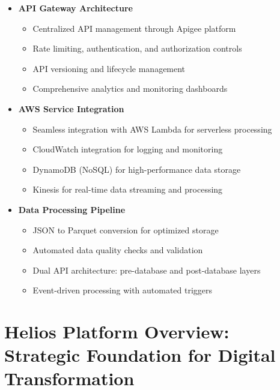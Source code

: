 \documentclass[12pt, a4paper]{article} %
\begin{document}
\begin{itemize}
    \item \textbf{API Gateway Architecture}
    \begin{itemize}
        \item Centralized API management through Apigee platform
        \item Rate limiting, authentication, and authorization controls
        \item API versioning and lifecycle management
        \item Comprehensive analytics and monitoring dashboards
    \end{itemize}
    
    \item \textbf{AWS Service Integration}
    \begin{itemize}
        \item Seamless integration with AWS Lambda for serverless processing
        \item CloudWatch integration for logging and monitoring
        \item DynamoDB (NoSQL) for high-performance data storage
        \item Kinesis for real-time data streaming and processing
    \end{itemize}
    
    \item \textbf{Data Processing Pipeline}
    \begin{itemize}
        \item JSON to Parquet conversion for optimized storage
        \item Automated data quality checks and validation
        \item Dual API architecture: pre-database and post-database layers
        \item Event-driven processing with automated triggers
    \end{itemize}
\end{itemize}


\section{Helios Platform Overview: Strategic Foundation for Digital Transformation}
\end{document}
